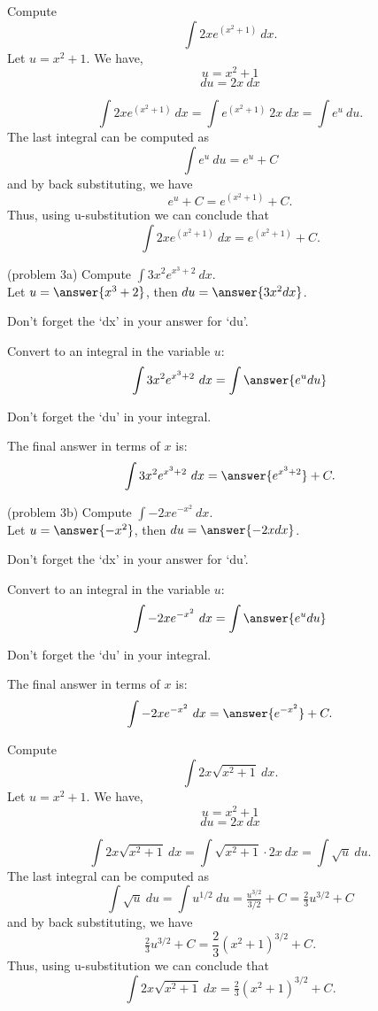 \documentclass[handout]{ximera}
\begin{document}
\begin{example}[example 3] 
Compute 
\[\int 2xe^{(x^2 + 1)} \ dx.\]
Let $u = x^2 + 1$.  We have,
\[u = x^2 + 1\]
\[du = 2x \ dx\]

\[\int 2xe^{(x^2 + 1)} \ dx = \int e^{(x^2 + 1)} \ 2x\  dx = \int e^u \ du.\]
The last integral can be computed as 
\[\int e^u \ du = e^u + C\]
and by back substituting, we have 
\[e^u + C = e^{(x^2 + 1)} + C.\]
Thus, using u-substitution we can conclude that
\[\int 2xe^{(x^2 + 1)} \ dx =  e^{(x^2 + 1)} + C.\]
\end{example}



\begin{problem}(problem 3a)
 Compute $\displaystyle{\int 3x^2e^{x^3 + 2} \ dx}$.\\
Let $u = \answer{x^3 + 2}$, then $du = \answer{3x^2 dx}$.\\
\begin{hint}
Don't forget the `dx' in your answer for `du'.
\end{hint}
Convert to an integral in the variable $u$:
\[\int 3x^2e^{x^3 + 2} \ dx = \int\answer{e^u du}\]
\begin{hint}
Don't forget the `du' in your integral.
\end{hint}
The final answer in terms of $x$ is:
\[\int 3x^2e^{x^3 + 2} \ dx = \answer{e^{x^3 + 2}} +C.\]
\end{problem}



\begin{problem}(problem 3b) 
Compute $\displaystyle{\int -2xe^{-x^2} \ dx}$.\\
Let $u = \answer{-x^2}$, then $du = \answer{-2x dx}$.\\
\begin{hint}
Don't forget the `dx' in your answer for `du'.
\end{hint}
Convert to an integral in the variable $u$:
\[\int -2xe^{-x^2} \ dx = \int\answer{e^u du}\]
\begin{hint}
Don't forget the `du' in your integral.
\end{hint}
The final answer in terms of $x$ is:
\[\int -2xe^{-x^2} \ dx = \answer{e^{-x^2}} +C.\]
\end{problem}



\begin{example}[example 4] 
Compute 
\[\int 2x\sqrt{x^2 + 1} \ dx.\]
Let $u = x^2 + 1$.  We have,
\[u = x^2 + 1\]
\[du = 2x \ dx\]

\[\int 2x\sqrt{x^2 + 1} \ dx = \int \sqrt{x^2 + 1} \cdot 2x\  dx = \int \sqrt{u} \ du.\]
The last integral can be computed as 
\[\int \sqrt u  \ du = \int u^{1/2} \ du = \tfrac{u^{3/2}}{3/2} + C = \tfrac23 u^{3/2} + C\]
and by back substituting, we have 
\[\tfrac23 u^{3/2}  + C = \frac23 (x^2 + 1)^{3/2} + C.\]
Thus, using u-substitution we can conclude that
\[\int 2x\sqrt{x^2 + 1} \ dx =  \tfrac23 (x^2 + 1)^{3/2} + C.\]
\end{example}
\end{document}
